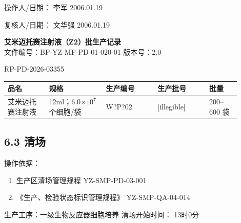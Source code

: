 \documentclass[UTF8,10pt,a4paper,fontset=fandol]{ctexart}
\newcommand{\fieldvalue}[1]{#1}
\newcommand{\handwritten}[1]{#1}
\begin{document}
\vspace{1em}

操作人/日期：
\fieldvalue{\handwritten{李军}}
\quad
\fieldvalue{\handwritten{2006.01.19}}

\hfill
复核人/日期：
\fieldvalue{\handwritten{文华强}}
\quad
\fieldvalue{\handwritten{2006.01.19}}

\newpage

\begin{center}
\textbf{艾米迈托赛注射液（Z2）批生产记录}\\
文件编号：BP-YZ-MF-PD-01-020-01 \qquad 版本号：2.0
\end{center}

\begin{center}
RP-PD-2026-03355
\end{center}

\begin{tabular}{|p{0.16\linewidth}|p{0.22\linewidth}|p{0.20\linewidth}|p{0.20\linewidth}|p{0.12\linewidth}|}
\hline
品名 & 规格 & 生产编号 & 生产批号 & 批量\\
\hline
艾米迈托赛注射液 & 12ml；6.0$\times 10^{7}$个细胞/袋 &
\fieldvalue{\handwritten{W?P?02}} &
\fieldvalue{\handwritten{[illegible]}} &
200--600 袋\\
\hline
\end{tabular}

\subsection*{6.3 清场}

操作依据：

\begin{enumerate}
    \item 生产区清场管理规程 \hfill YZ-SMP-PD-03-001
    \item 《生产、检验状态标识管理规程》 \hfill YZ-SMP-QA-04-014
\end{enumerate}

生产工序：一级生物反应器细胞培养 \hfill 清场开始时间：
\fieldvalue{\handwritten{13时0分}}
\end{document}
